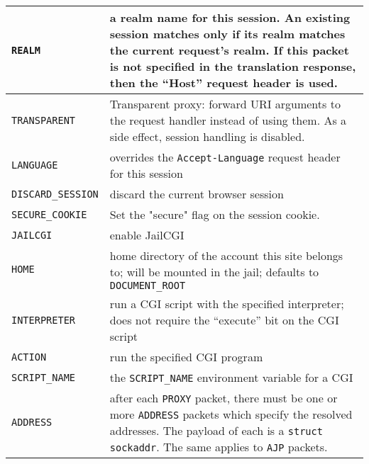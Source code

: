 \documentclass[a4paper,12pt]{article}
\begin{document}
\begin{longtable}{|l|p{8cm}|}
\hline

\verb|REALM| & a realm name for this session.  An existing session
matches only if its realm matches the current request's realm.  If
this packet is not specified in the translation response, then the
``Host'' request header is used. \\

\hline

\verb|TRANSPARENT| & Transparent proxy: forward URI arguments to the
request handler instead of using them.  As a side effect, session
handling is disabled. \\

\hline

\verb|LANGUAGE| & overrides the \texttt{Accept-Language} request
header for this session \\
\hline

\verb|DISCARD_SESSION| & discard the current browser session \\

\hline

\verb|SECURE_COOKIE| & Set the "secure" flag on the session cookie. \\

\hline

\verb|JAILCGI| & enable JailCGI \\

\hline

\verb|HOME| & home directory of the account this site belongs to;
will be mounted in the jail; defaults to \verb|DOCUMENT_ROOT| \\

\hline

\verb|INTERPRETER| & run a CGI script with the specified
interpreter; does not require the ``execute'' bit on the CGI script \\

\hline

\verb|ACTION| & run the specified CGI program \\

\hline

\verb|SCRIPT_NAME| & the \verb|SCRIPT_NAME| environment variable
for a CGI \\

\hline

\verb|ADDRESS| & after each \verb|PROXY| packet, there must be one
or more \verb|ADDRESS| packets which specify the resolved addresses.
The payload of each is a \texttt{struct sockaddr}.
The same applies to \verb|AJP| packets. \\


\end{longtable}
\end{document}
